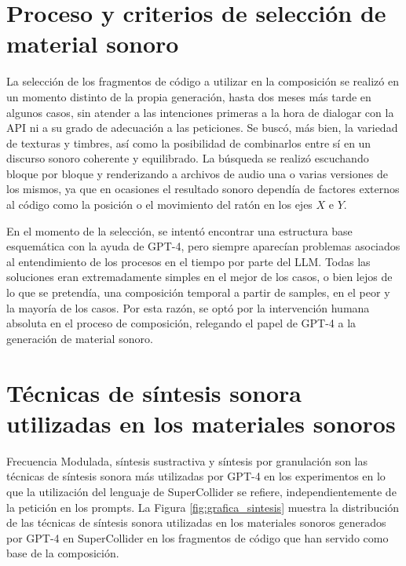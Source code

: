 \section{Proceso y criterios de selección de material sonoro}

La selección de los fragmentos de código a utilizar en la composición se realizó en un momento distinto de la propia generación, hasta dos meses más tarde en algunos casos, sin atender a las intenciones primeras a la hora de dialogar con la API ni a su grado de adecuación a las peticiones. Se buscó, más bien, la variedad de texturas y timbres, así como la posibilidad de combinarlos entre sí en un discurso sonoro coherente y equilibrado. La búsqueda se realizó escuchando bloque por bloque y renderizando a archivos de audio una o varias versiones de los mismos, ya que en ocasiones el resultado sonoro dependía de factores externos al código como la posición o el movimiento del ratón en los ejes $X$ e $Y$. 

En el momento de la selección, se intentó encontrar una estructura base esquemática con la ayuda de GPT-4, pero siempre aparecían problemas asociados al entendimiento de los procesos en el tiempo por parte del LLM. Todas las soluciones eran extremadamente simples en el mejor de los casos, o bien lejos de lo que se pretendía, una composición temporal a partir de samples, en el peor y la mayoría de los casos. Por esta razón, se optó por la intervención humana absoluta en el proceso de composición, relegando el papel de GPT-4 a la generación de material sonoro.

\section{Técnicas de síntesis sonora utilizadas en los materiales sonoros}

Frecuencia Modulada, síntesis sustractiva y síntesis por granulación son las técnicas de síntesis sonora más utilizadas por GPT-4 en los experimentos en lo que la utilización del lenguaje de SuperCollider se refiere, independientemente de la petición en los prompts. La Figura \ref{fig:grafica_sintesis} muestra la distribución de las técnicas de síntesis sonora utilizadas en los materiales sonoros generados por GPT-4 en SuperCollider en los fragmentos de código que han servido como base de la composición.


